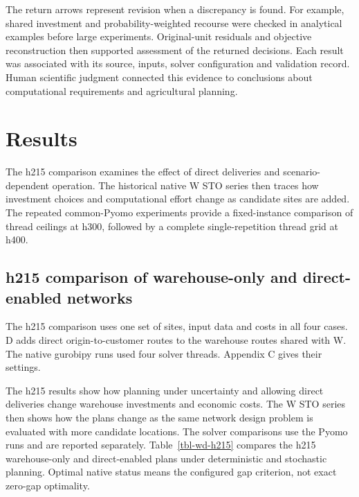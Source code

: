 \documentclass[
  english,
  11pt,
  a4paper,
  authoryear,
  preprint]{elsarticle}
\begin{document}
The return arrows represent revision when a discrepancy is found. For
example, shared investment and probability-weighted recourse were
checked in analytical examples before large experiments. Original-unit
residuals and objective reconstruction then supported assessment of the
returned decisions. Each result was associated with its source, inputs,
solver configuration and validation record. Human scientific judgment
connected this evidence to conclusions about computational requirements
and agricultural planning.

\section{Results}\label{results}

The h215 comparison examines the effect of direct deliveries and
scenario-dependent operation. The historical native W STO series then
traces how investment choices and computational effort change as
candidate sites are added. The repeated common-Pyomo experiments provide
a fixed-instance comparison of thread ceilings at h300, followed by a
complete single-repetition thread grid at h400.

\subsection{h215 comparison of warehouse-only and direct-enabled
networks}\label{h215-comparison-of-warehouse-only-and-direct-enabled-networks}

The h215 comparison uses one set of sites, input data and costs in all
four cases. D adds direct origin-to-customer routes to the warehouse
routes shared with W. The native gurobipy runs used four solver threads.
Appendix C gives their settings.

The h215 results show how planning under uncertainty and allowing direct
deliveries change warehouse investments and economic costs. The W STO
series then shows how the plans change as the same network design
problem is evaluated with more candidate locations. The solver
comparisons use the Pyomo runs and are reported separately.
Table~\ref{tbl-wd-h215} compares the h215 warehouse-only and
direct-enabled plans under deterministic and stochastic planning.
Optimal native status means the configured gap criterion, not exact
zero-gap optimality.
\end{document}
